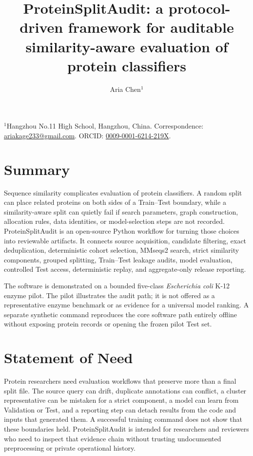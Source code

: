\documentclass[11pt]{article}
\title{\bfseries ProteinSplitAudit: a protocol-driven framework for auditable\\
similarity-aware evaluation of protein classifiers}
\author{Aria Chen$^{1}$}
\date{}
\begin{document}
\maketitle
\thispagestyle{empty}

{\small $^{1}$Hangzhou No.11 High School, Hangzhou, China.
Correspondence: \href{mailto:ariakage233@gmail.com}{ariakage233@gmail.com}.
ORCID: \href{https://orcid.org/0009-0001-6214-219X}{0009-0001-6214-219X}.}

\vspace{1em}

\section*{Summary}

Sequence similarity complicates evaluation of protein classifiers. A random split can place
related proteins on both sides of a Train--Test boundary, while a similarity-aware split can
quietly fail if search parameters, graph construction, allocation rules, data identities, or
model-selection steps are not recorded. ProteinSplitAudit is an open-source Python workflow for
turning those choices into reviewable artifacts. It connects source acquisition, candidate
filtering, exact deduplication, deterministic cohort selection, MMseqs2 search, strict similarity
components, grouped splitting, Train--Test leakage audits, model evaluation, controlled Test
access, deterministic replay, and aggregate-only release reporting.

The software is demonstrated on a bounded five-class \emph{Escherichia coli} K-12 enzyme pilot. The
pilot illustrates the audit path; it is not offered as a representative enzyme benchmark or as
evidence for a universal model ranking. A separate synthetic command reproduces the core software
path entirely offline without exposing protein records or opening the frozen pilot Test set.

\section*{Statement of Need}

Protein researchers need evaluation workflows that preserve more than a final split file. The
source query can drift, duplicate annotations can conflict, a cluster representative can be
mistaken for a strict component, a model can learn from Validation or Test, and a reporting step
can detach results from the code and inputs that generated them. A successful training command
does not show that these boundaries held. ProteinSplitAudit is intended for researchers and
reviewers who need to inspect that evidence chain without trusting undocumented preprocessing or
private operational history.
\end{document}
